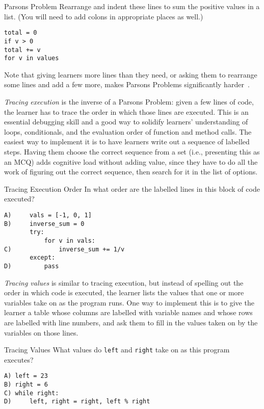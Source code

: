 \begin{aside}{Parsons Problem}
  Rearrange and indent these lines to sum the positive values in a list.
  (You will need to add colons in appropriate places as well.)

\begin{verbatim}
total = 0
if v > 0
total += v
for v in values
\end{verbatim}
\end{aside}

Note that giving learners more lines than they need,
or asking them to rearrange some lines and add a few more,
makes Parsons Problems significantly harder~\cite{Harm2016}.


\emph{Tracing execution} is the inverse of a Parsons Problem:
given a few lines of code,
the learner has to trace the order in which those lines are executed.
This is an essential debugging skill
and a good way to solidify learners' understanding of loops, conditionals,
and the evaluation order of function and method calls.
The easiest way to implement it is to have learners write out a sequence of labelled steps.
Having them choose the correct sequence from a set
(i.e., presenting this as an MCQ)
adds cognitive load without adding value,
since they have to do all the work of figuring out the correct sequence,
then search for it in the list of options.

\begin{aside}{Tracing Execution Order}
  In what order are the labelled lines in this block of code executed?

\begin{verbatim}
A)     vals = [-1, 0, 1]
B)     inverse_sum = 0
       try:
           for v in vals:
C)             inverse_sum += 1/v
       except:
D)         pass
\end{verbatim}
\end{aside}

\emph{Tracing values} is similar to tracing execution,
but instead of spelling out the order in which code is executed,
the learner lists the values that one or more variables take on
as the program runs.
One way to implement this is to give the learner a table
whose columns are labelled with variable names
and whose rows are labelled with line numbers,
and ask them to fill in the values taken on by the variables on those lines.

\begin{aside}{Tracing Values}
  What values do \texttt{left} and \texttt{right} take on as this program executes?

\begin{verbatim}
A) left = 23
B) right = 6
C) while right:
D)     left, right = right, left % right
\end{verbatim}
\end{aside}

